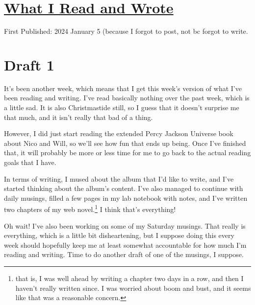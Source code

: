 \documentclass[12pt]{article}[titlepage]
\renewcommand{\,}{\textsuperscript{,}}
\begin{document}
\doublespacing
\section{\href{reading-writing-24-01-04.html}{What I Read and Wrote}}
First Published: 2024 January 5 (because I forgot to post, not bc forgot to write.

\section{Draft 1}
It's been another week, which means that I get this week's version of what I've been reading and writing.
I've read basically nothing over the past week, which is a little sad.
It is also Christmastide still, so I guess that it doesn't surprise me that much, and it isn't really that bad of a thing.

However, I did just start reading the extended Percy Jackson Universe book about Nico and Will, so we'll see how fun that ends up being.
Once I've finished that, it will probably be more or less time for me to go back to the actual reading goals that I have.

In terms of writing, I mused about the album that I'd like to write, and I've started thinking about the album's content.
I've also managed to continue with daily musings, filled a few pages in my lab notebook with notes, and I've written two chapters of my web novel.\footnote{that is, I was well ahead by writing a chapter two days in a row, and then I haven't really written since. I was worried about boom and bust, and it seems like that was a reasonable concern.}
I think that's everything!

Oh wait! I've also been working on some of my Saturday musings.
That really is everything, which is a little bit disheartening, but I suppose doing this every week should hopefully keep me at least somewhat accountable for how much I'm reading and writing.
Time to do another draft of one of the musings, I suppose.
\end{document}

